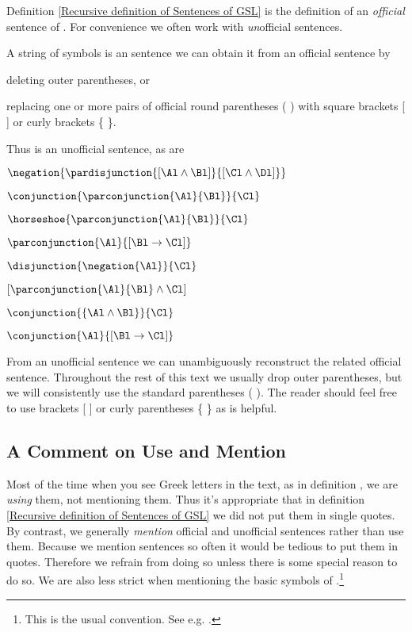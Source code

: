 Definition \ref{Recursive definition of Sentences of GSL} is the definition of an \emph{official} sentence of \GSL{}.
For convenience we often work with \emph{un}official sentences. 
\begin{majorILnc}{}
A string of symbols is an  sentence \Iff we can obtain it from an official sentence by
\begin{cenumerate}
\item deleting outer parentheses, or
\item replacing one or more pairs of official round parentheses ( ) with square brackets [ ] or curly brackets \{ \}.
\end{cenumerate}
\end{majorILnc}
\noindent{}Thus \mention{$\conjunction{\Al}{\conjunction{\Bl}{\Cl}}$} is an unofficial sentence, as are
\begin{multicols}{2}
\begin{smenumerate}
\item\label{usex1} $\negation{\pardisjunction{[\Al\wedge\Bl]}{[\Cl\wedge\Dl]}}$
\item $\conjunction{\parconjunction{\Al}{\Bl}}{\Cl}$
\item $\horseshoe{\parconjunction{\Al}{\Bl}}{\Cl}$
\item $\parconjunction{\Al}{[\Bl\rightarrow\Cl]}$
\item $\disjunction{\negation{\Al}}{\Cl}$
\item $[\parconjunction{\Al}{\Bl}\wedge\Cl]$
\item $\conjunction{\{\Al\wedge\Bl\}}{\Cl}$
\item\label{usexL} $\conjunction{\Al}{[\Bl\rightarrow\Cl]}$
\end{smenumerate}
\end{multicols}
\noindent{}From an unofficial sentence we can unambiguously reconstruct the related official sentence. 
Throughout the rest of this text we usually drop outer parentheses, but we will consistently use the standard parentheses ( ). 
The reader should feel free to use brackets [ ] or curly parentheses \{ \} as is helpful. 

\subsection{A Comment on Use and Mention}\label{use mention comment}

Most of the time when you see Greek letters in the text, as in definition , we are \emph{using} them, not mentioning them. 
Thus it's appropriate that in definition \ref{Recursive definition of Sentences of GSL} we did not put them in single quotes.
By contrast, we generally \emph{mention} official and unofficial \GSL{} sentences rather than use them.
Because we mention \GSL{} sentences so often it would be tedious to put them in quotes. 
Therefore we refrain from doing so unless there is some special reason to do so.  
We are also less strict when mentioning the basic symbols of \GSL{}.\footnote{This is the usual convention. See e.g. \citealt[7]{Hodges2001}.}


